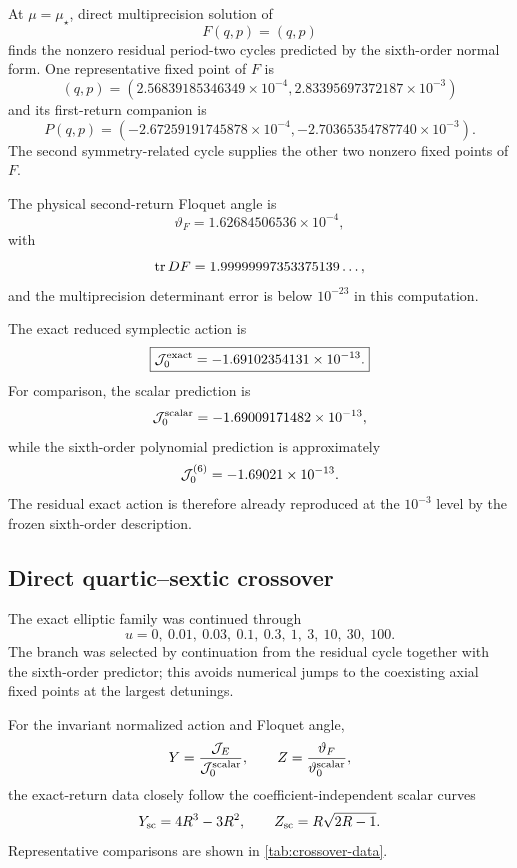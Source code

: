 At $\mu=\mu_\star$, direct multiprecision solution of
\[
F(q,p)=(q,p)
\]
finds the nonzero residual period-two cycles predicted by the sixth-order normal form.  One representative fixed point of $F$ is
\[
\boxed{
(q,p)
=
(2.56839185346349\times10^{-4},
 2.83395697372187\times10^{-3})
}
\]
and its first-return companion is
\[
P(q,p)
=
(-2.67259191745878\times10^{-4},
 -2.70365354787740\times10^{-3}).
\]
The second symmetry-related cycle supplies the other two nonzero fixed points of $F$.

The physical second-return Floquet angle is
\[
\boxed{
\vartheta_F
=1.62684506536\times10^{-4},
}
\]
with
\[
\operatorname{tr} DF
=1.99999997353375139\ldots,
\]
and the multiprecision determinant error is below $10^{-23}$ in this computation.

The exact reduced symplectic action is
\begin{equation}
\boxed{
\mathcal{J}_0^{\rm exact}
=-1.69102354131\times10^{-13}.
}
\label{eq:residual-action-exact}
\end{equation}
For comparison, the scalar prediction is
\[
\mathcal{J}_0^{\rm scalar}
=-1.69009171482\times10^{-13},
\]
while the sixth-order polynomial prediction is approximately
\[
\mathcal{J}_0^{(6)}
=-1.69021\times10^{-13}.
\]
The residual exact action is therefore already reproduced at the $10^{-3}$ level by the frozen sixth-order description.

\subsection{Direct quartic--sextic crossover}
\label{sec:numerical-crossover}

The exact elliptic family was continued through
\[
u=0,\ 0.01,\ 0.03,\ 0.1,\ 0.3,\ 1,\ 3,\ 10,\ 30,\ 100.
\]
The branch was selected by continuation from the residual cycle together with the sixth-order predictor; this avoids numerical jumps to the coexisting axial fixed points at the largest detunings.

For the invariant normalized action and Floquet angle,
\[
Y=\frac{\mathcal{J}_E}{\mathcal{J}_0^{\rm scalar}},
\qquad
Z=\frac{\vartheta_F}{\vartheta_0^{\rm scalar}},
\]
the exact-return data closely follow the coefficient-independent scalar curves
\[
Y_{\rm sc}=4R^3-3R^2,
\qquad
Z_{\rm sc}=R\sqrt{2R-1}.
\]
Representative comparisons are shown in \cref{tab:crossover-data}.

